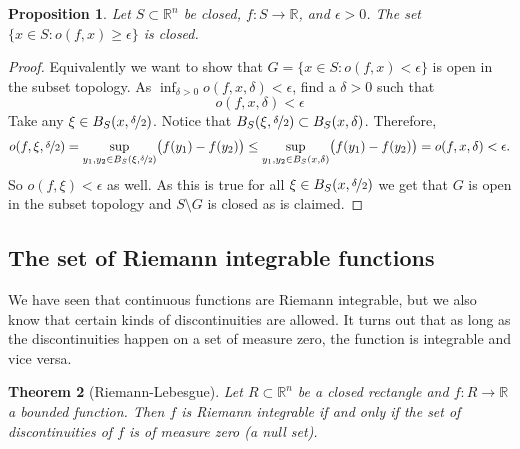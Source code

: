 \documentclass[12pt]{book}
\newcommand{\R}{{\mathbb{R}}}
\theoremstyle{plain}
\newtheorem{thm}{Theorem}[section]
\newtheorem{prop}[thm]{Proposition}
\theoremstyle{remark}
\theoremstyle{definition}
\theoremstyle{exercise}
\theoremstyle{example}
\begin{document}
\begin{prop} \label{prop:seclosed}
Let $S \subset \R^n$ be closed,
$f \colon S \to \R$, and $\epsilon > 0$.
The set $\{ x \in S : o(f,x) \geq \epsilon \}$ is closed.
\end{prop}

\begin{proof}
Equivalently we want to show that
$G = \{ x \in S : o(f,x) < \epsilon \}$ is open in the subset topology.
As $\inf_{\delta > 0} o(f,x,\delta) < \epsilon$, find a $\delta > 0$ such
that
\begin{equation*}
o(f,x,\delta) < \epsilon
\end{equation*}
Take any $\xi \in B_S(x,\nicefrac{\delta}{2})$.  Notice that
$B_S(\xi,\nicefrac{\delta}{2}) \subset B_S(x,\delta)$.  Therefore,
\begin{equation*}
o(f,\xi,\nicefrac{\delta}{2}) =
\sup_{y_1,y_2 \in B_S(\xi,\nicefrac{\delta}{2})} \bigl(f(y_1)-f(y_2)\bigr) 
\leq
\sup_{y_1,y_2 \in B_S(x,\delta)} \bigl(f(y_1)-f(y_2)\bigr) = o(f,x,\delta) <
\epsilon .
\end{equation*}
So $o(f,\xi) < \epsilon$ as well.  As this is true for all $\xi \in
B_S(x,\nicefrac{\delta}{2})$ we get that $G$ is open in the subset
topology and $S \setminus G$ is closed as is claimed.
\end{proof}


\subsection{The set of Riemann integrable functions}

We have seen that continuous functions are Riemann integrable, but we also
know that certain kinds of discontinuities are allowed.
It turns out that as long as the discontinuities happen on a set of measure
zero, the function is integrable and vice versa.

\begin{thm}[Riemann-Lebesgue]
Let $R \subset \R^n$ be a closed rectangle and $f \colon R \to \R$
a bounded function.  Then $f$ is Riemann integrable if and only if
the set of discontinuities of $f$ is of measure zero (a null set).
\end{thm}
\end{document}
